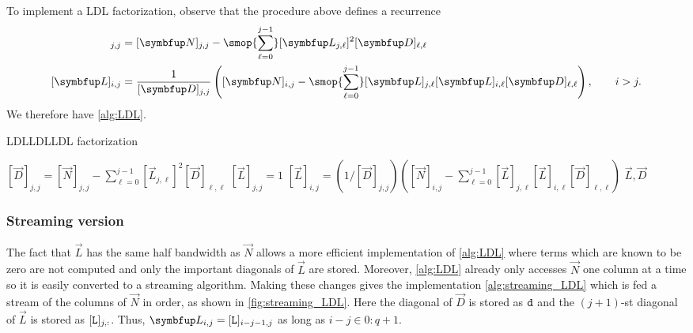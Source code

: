 To implement a LDL factorization, observe that the procedure above defines a recurrence
\begin{align*}
    [\vec{D}]_{j,j} &= [\vec{N}]_{j,j} - \smop{\sum_{\ell=0}^{j-1}} [\vec{L}_{j,\ell}]^2 [\vec{D}]_{\ell,\ell}
    \\
    [\vec{L}]_{i,j} &= \frac{1}{[\vec{D}]_{j,j}} \left( [\vec{N}]_{i,j} - \smop{\sum_{\ell=0}^{j-1}}[\vec{L}]_{j,\ell} [\vec{L}]_{i,\ell} [\vec{D}]_{\ell,\ell} \right)
    ,\qquad i > j.
\end{align*}
We therefore have \cref{alg:LDL}.

\begin{labelalgorithm}[htb]{LDL}{LDL}{LDL factorization}
\begin{algorithmic}[1]
    \State \( [\vec{D}]_{j,j} = [\vec{N}]_{j,j} - \sum_{\ell=0}^{j-1} [\vec{L}_{j,\ell}]^2 [\vec{D}]_{\ell,\ell} \)
    \State \( [\vec{L}]_{j,j} = 1 \)
    \State \( [\vec{L}]_{i,j} = (1/[\vec{D}]_{j,j})( [\vec{N}]_{i,j} - \sum_{\ell=0}^{j-1}[\vec{L}]_{j,\ell} [\vec{L}]_{i,\ell} [\vec{D}]_{\ell,\ell} ) \)
    \EndFor
    \EndFor
    \State \Return \( \vec{L}, \vec{D} \)
\EndProcedure
\end{algorithmic}
\end{labelalgorithm}

\subsubsection{Streaming version}

The fact that $\vec{L}$ has the same half bandwidth as $\vec{N}$ allows a more efficient implementation of \cref{alg:LDL} where terms which are known to be zero are not computed and only the important diagonals of $\vec{L}$ are stored.
Moreover, \cref{alg:LDL} already only accesses $\vec{N}$ one column at a time so it is easily converted to a streaming algorithm.
Making these changes gives the implementation \cref{alg:streaming_LDL} which is fed a stream of the columns of $\vec{N}$ in order, as shown in \cref{fig:streaming_LDL}.
Here the diagonal of $\vec{D}$ is stored as $\texttt{d}$ and the $(j+1)$-st diagonal of $\vec{L}$ is stored as $[\texttt{L}]_{j,:}$.
Thus, $\vec{L}_{i,j} = [\ms{L}]_{i-j-1,j}$ as long as $i-j \in 0:q+1$.


